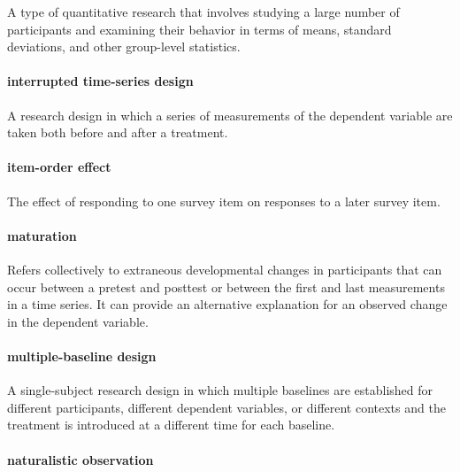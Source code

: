 \documentclass[
]{krantz}
\begin{document}
A type of quantitative research that involves studying a large number of participants and examining their behavior in terms of means, standard deviations, and other group-level statistics.

\paragraph*{interrupted time-series design}\label{interrupted-time-series-design-1}

A research design in which a series of measurements of the dependent variable are taken both before and after a treatment.

\paragraph*{item-order effect}\label{item-order-effect}

The effect of responding to one survey item on responses to a later survey item.

\paragraph*{maturation}\label{maturation}

Refers collectively to extraneous developmental changes in participants that can occur between a pretest and posttest or between the first and last measurements in a time series. It can provide an alternative explanation for an observed change in the dependent variable.

\paragraph*{multiple-baseline design}\label{multiple-baseline-design}

A single-subject research design in which multiple baselines are established for different participants, different dependent variables, or different contexts and the treatment is introduced at a different time for each baseline.

\paragraph*{naturalistic observation}\label{naturalistic-observation}
\end{document}

